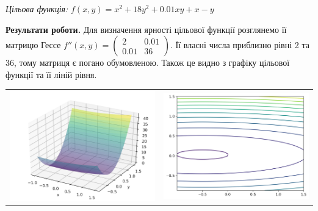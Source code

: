 \documentclass{extreport}
\begin{document}
\emph{Цільова функція:}
$f(x,y) = x^2 + 18y^2 + 0.01xy + x - y$

\noindent\textbf{Результати роботи.}
Для визначення ярності цільової функції розглянемо її матрицю Гессе
$f''(x,y) = \begin{pmatrix}
    2 & 0.01 \\
    0.01 & 36
\end{pmatrix}$. Її власні числа приблизно рівні 2 та 36, тому матриця є погано обумовленою.
Також це видно з графіку цільової функції та її ліній рівня.
\begin{center}
    \begin{tabular}{c c}
        \includegraphics[scale = 0.6]{surface_init.png} &
        \includegraphics[scale = 0.5]{contour_init.png}
    \end{tabular}
\end{center}
\end{document}
